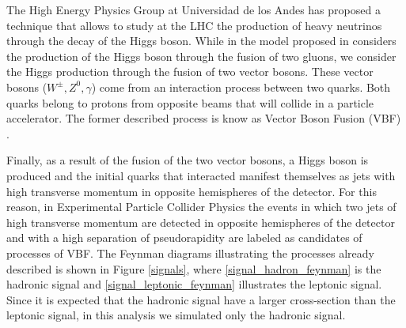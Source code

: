 The High Energy Physics Group at Universidad de los Andes has proposed a technique that allows to study at the LHC the production of heavy neutrinos through the decay of the Higgs boson. While in 
the model proposed in \cite{Seesaw Mechanism with displaced vertices} considers the production of the Higgs boson through the fusion of two gluons, we consider the Higgs production through the fusion
of two vector bosons. These vector bosons ($W^{\pm},Z^0,\gamma$) come from an interaction process between two quarks. Both quarks belong to protons from opposite beams that will collide in a 
particle accelerator. The former described process is know as Vector Boson Fusion (VBF) \cite{VBF processes}. 

Finally, as a result of the fusion of the two vector bosons, a Higgs boson is produced and the initial quarks that interacted manifest themselves as jets with high transverse momentum in opposite
hemispheres of the detector. For this reason, in Experimental Particle Collider Physics the events in which two jets of high transverse momentum are detected in opposite hemispheres of the detector 
and with a high separation of pseudorapidity are labeled as candidates of processes of VBF. The Feynman diagrams illustrating the processes already described is shown in Figure \ref{signals},
where \ref{signal_hadron_feynman} is the hadronic signal and \ref{signal_leptonic_feynman} illustrates the leptonic signal. Since it is expected that the hadronic signal have a larger cross-section
than the leptonic signal, in this analysis we simulated only the hadronic signal.



